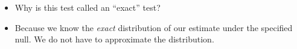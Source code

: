 \documentclass[xcolor={dvipsnames},handout]{beamer}
\begin{document}

\renewcommand{\Sweavesize}{\scriptsize}
%
%
%
%
%
%
%
%
%
%
%
\begin{frame}

\begin{itemize}
\item Why is this test called an ``exact'' test?
\item Because we know the \textit{exact} distribution of our estimate under the specified null. We do not have to approximate the distribution.
\end{itemize}

\end{frame}


\end{document}
